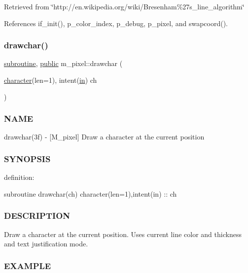 Retrieved from \char`\"{}http\+://en.\+wikipedia.\+org/wiki/\+Bresenham\%27s\+\_\+line\+\_\+algorithm\char`\"{} 

References if\+\_\+init(), p\+\_\+color\+\_\+index, p\+\_\+debug, p\+\_\+pixel, and swapcoord().

\mbox{\label{namespacem__pixel_a58406ffd6c2a9fdf2ea7772198b54255}} 
\subsubsection{\texorpdfstring{drawchar()}{drawchar()}}
{\footnotesize\ttfamily \hyperlink{M__stopwatch_83_8txt_acfbcff50169d691ff02d4a123ed70482}{subroutine}, \hyperlink{M__stopwatch_83_8txt_a2f74811300c361e53b430611a7d1769f}{public} m\+\_\+pixel\+::drawchar (\begin{DoxyParamCaption}\item[{\hyperlink{option__stopwatch_83_8txt_abd4b21fbbd175834027b5224bfe97e66}{character}(len=1), intent(\hyperlink{M__journal_83_8txt_afce72651d1eed785a2132bee863b2f38}{in})}]{ch }\end{DoxyParamCaption})}



\subsubsection*{N\+A\+ME}

drawchar(3f) -\/ \mbox{[}M\+\_\+pixel\mbox{]} Draw a character at the current position 

\subsubsection*{S\+Y\+N\+O\+P\+S\+IS}

definition\+:

subroutine drawchar(ch) character(len=1),intent(in) \+:\+: ch

\subsubsection*{D\+E\+S\+C\+R\+I\+P\+T\+I\+ON}

Draw a character at the current position. Uses current line color and thickness and text justification mode.

\subsubsection*{E\+X\+A\+M\+P\+LE}

